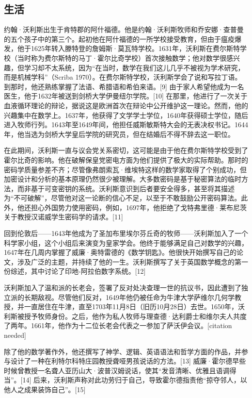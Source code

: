 \subsection{生活}
约翰·沃利斯出生于肯特郡的阿什福德。他是约翰·沃利斯牧师和乔安娜·查普曼的五个孩子中的第三个。起初他在阿什福德的一所学校接受教育，但由于瘟疫爆发，他于1625年转入滕特登的詹姆斯·莫瓦特学校。1631年，沃利斯在费尔斯特学校（当时称为费尔斯特的马丁·霍尔比奇学校）首次接触数学；他对数学很感兴趣，但学习却不太系统，因为“在当时，数学在我们这儿几乎不被视为学术研究，而是机械学科”（Scriba 1970）。在费尔斯特学校，沃利斯学会了说和写拉丁语。到那时，他还熟练掌握了法语、希腊语和希伯来语。[9] 由于家人希望他成为一名医生，他于1632年被送到剑桥大学伊曼纽尔学院。[10] 在那里，他进行了一次关于血液循环理论的辩论，据说这是欧洲首次在辩论中公开维护这一理论。然而，他的兴趣集中在数学上。1637年，他获得了文学学士学位，1640年获得硕士学位，随后进入牧师行列。1643年至1649年间，他担任威斯敏斯特大会的无表决权书记。1644年，他当选为剑桥大学皇后学院的研究员，但在结婚后不得不辞去这一职位。

在此期间，沃利斯一直与议会党关系密切，这可能是由于他在费尔斯特学校受到了霍尔比奇的影响。他在破解保皇党密电方面为他们提供了极大的实际帮助。那时的密码学质量参差不齐；尽管像弗朗索瓦·维埃特这样的数学家取得了个别成功，但加密设计和分析的基本原理仍然很少被理解。大多数密码是基于秘密算法的临时方法，而非基于可变密钥的系统。沃利斯意识到后者要安全得多，甚至将其描述为“不可破解”，尽管他对这一论断的信心不足，以至于不敢鼓励公开密码算法。此外，他还担心外国势力使用密码，例如，1697年，他拒绝了戈特弗里德·莱布尼茨关于教授汉诺威学生密码学的请求。[11]

回到伦敦后——1643年他成为了圣加布里埃尔芬丘奇的牧师——沃利斯加入了一个科学家小组，这个小组后来演变为皇家学会。他终于能够满足自己对数学的兴趣，1647年在几周内掌握了威廉·奥特雷德的《数学钥匙》。他很快开始撰写自己的论文，涉及广泛的主题，并持续了他的一生。沃利斯撰写了关于英国数学概念的第一份综述，其中讨论了印地-阿拉伯数字系统。[12]

沃利斯加入了温和派的长老会，签署了反对处决查理一世的抗议书，因此遭到了独立派的长期敌视。尽管他们反对，1649年他仍被任命为牛津大学萨维尔几何学教授，并一直居住在牛津，直至1703年11月8日（旧历10月28日）去世。1650年，沃利斯被授予牧师身份。之后，他作为私人牧师与理查德·达利爵士和维尔夫人共度了两年。1661年，他作为十二位长老会代表之一参加了萨沃伊会议。[citation needed]

除了他的数学著作外，他还撰写了神学、逻辑、英语语法和哲学方面的作品，并参与设计了一种在利特尔科特庄园教授聋哑男孩说话的方法。[13] 威廉·霍尔德早些时候曾教授一名聋人亚历山大·波普汉姆说话，使其“发音清晰、优雅且语调得当”。[14] 后来，沃利斯声称对此功劳归于自己，导致霍尔德指责他“掠夺邻人，以他人之成果装饰自己”。[15]
